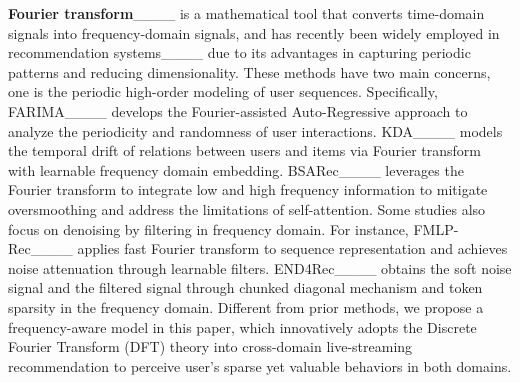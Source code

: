 \textbf{Fourier transform}____ is a mathematical tool that converts time-domain signals into frequency-domain signals, and has recently been widely employed in recommendation systems____ due to its advantages in capturing periodic patterns and reducing dimensionality.  
These methods have two main concerns, one is the periodic high-order modeling of user sequences. Specifically, FARIMA____ develops the Fourier-assisted Auto-Regressive approach to analyze the periodicity and randomness of user interactions. KDA____ models the temporal drift of relations between users and items via Fourier transform with learnable frequency domain embedding. BSARec____ leverages the Fourier transform to integrate low and high frequency information to mitigate oversmoothing and address the limitations of self-attention. Some studies also focus on denoising by filtering in frequency domain. For instance, FMLP-Rec____ applies fast Fourier transform to sequence representation and achieves noise attenuation through learnable filters. END4Rec____ obtains the soft noise signal and the filtered signal through chunked diagonal mechanism and token sparsity in the frequency domain. Different from prior methods, we propose a frequency-aware model in this paper, which innovatively adopts the Discrete Fourier Transform (DFT) theory into cross-domain live-streaming recommendation to perceive user's sparse yet valuable behaviors in both domains.